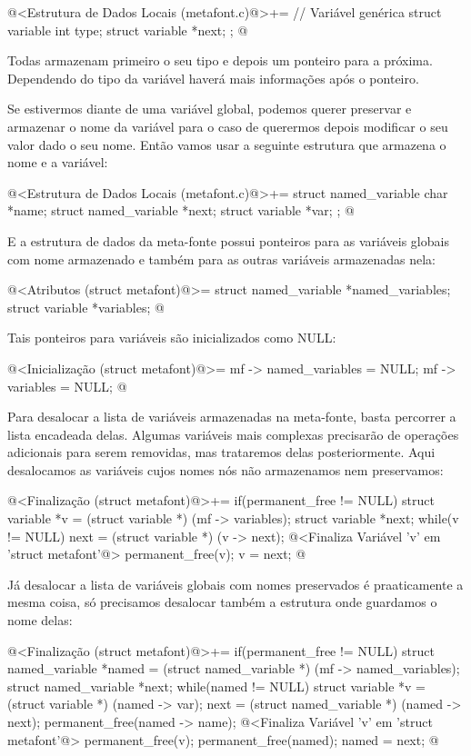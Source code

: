 \iniciocodigo
@<Estrutura de Dados Locais (metafont.c)@>+=
// Variável genérica
struct variable{
  int type;
  struct variable *next;
};
@
\fimcodigo

Todas armazenam primeiro o seu tipo e depois um ponteiro para a
próxima. Dependendo do tipo da variável haverá mais informações
após o ponteiro.

Se estivermos diante de uma variável global, podemos querer preservar
e armazenar o nome da variável para o caso de querermos depois
modificar o seu valor dado o seu nome. Então vamos usar a seguinte
estrutura que armazena o nome e a variável:

\iniciocodigo
@<Estrutura de Dados Locais (metafont.c)@>+=
struct named_variable{
  char *name;
  struct named_variable *next;
  struct variable *var;
};
@
\fimcodigo

E a estrutura de dados da meta-fonte possui ponteiros para as
variáveis globais com nome armazenado e também para as outras
variáveis armazenadas nela:

\iniciocodigo
@<Atributos (struct metafont)@>=
  struct named_variable *named_variables;
  struct variable *variables;
@
\fimcodigo

Tais ponteiros para variáveis são inicializados como NULL:

\iniciocodigo
@<Inicialização (struct metafont)@>=
mf -> named_variables = NULL;
mf -> variables = NULL;
@
\fimcodigo

Para desalocar a lista de variáveis armazenadas na meta-fonte, basta
percorrer a lista encadeada delas. Algumas variáveis mais complexas
precisarão de operações adicionais para serem removidas, mas
trataremos delas posteriormente. Aqui desalocamos as variáveis cujos
nomes nós não armazenamos nem preservamos:

\iniciocodigo
@<Finalização (struct metafont)@>+=
if(permanent_free != NULL){
  struct variable *v = (struct variable *) (mf -> variables);
  struct variable *next;
  while(v != NULL){
    next = (struct variable *) (v -> next);
    @<Finaliza Variável 'v' em 'struct metafont'@>
    permanent_free(v);
    v = next;
  }
}
@
\fimcodigo

Já desalocar a lista de variáveis globais com nomes preservados é
praaticamente a mesma coisa, só precisamos desalocar também a
estrutura onde guardamos o nome delas:

\iniciocodigo
@<Finalização (struct metafont)@>+=
if(permanent_free != NULL){
  struct named_variable *named = (struct named_variable *)
                                   (mf -> named_variables);
  struct named_variable *next;
  while(named != NULL){
    struct variable *v = (struct variable *) (named -> var);
    next = (struct named_variable *) (named -> next);
    permanent_free(named -> name);
    @<Finaliza Variável 'v' em 'struct metafont'@>
    permanent_free(v);
    permanent_free(named);
    named = next;
  }
}
@
\fimcodigo

